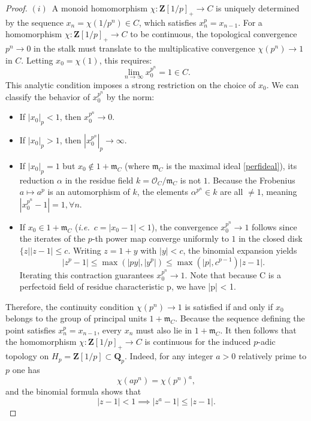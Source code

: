 \documentclass[11pt,a4paper]{article}
\newcommand{\Q}{\mathbf{Q}}
\newcommand{\Z}{\mathbf{Z}}
\def\ie{{\it i.e.\/}\ }
\begin{document}
\begin{proof} 
$(i)$~A  monoid homomorphism $\chi : \Z[1/p]_+ \to C$ is uniquely determined by the sequence $x_n = \chi(1/p^n) \in C$, which satisfies $x_n^p = x_{n-1}$. For a homomorphism $\chi : \Z[1/p]_+ \to C$ to be continuous, the topological convergence $p^n \to 0$ in the stalk must translate to the multiplicative convergence $\chi(p^n) \to 1$ in $C$. Letting $x_0 = \chi(1)$, this requires:
\[
\lim_{n \to \infty} x_0^{p^n} = 1 \in C.
\]
This analytic condition imposes a strong restriction on the choice of $x_0$. We can classify the behavior of $x_0^{p^n}$ by the  norm:
\begin{itemize}
    \item If $|x_0|_p < 1$, then $x_0^{p^n} \to 0$.
    \item If $|x_0|_p > 1$, then $|x_0^{p^n}|_p \to \infty$.
    \item If $|x_0|_p = 1$ but $x_0 \notin 1 + \mathfrak{m}_{C}$ (where $\mathfrak{m}_{C}$ is the maximal ideal \eqref{perfideal}), its reduction $\alpha$ in the residue field $
k=\mathcal{O}_C / \mathfrak{m}_C
$ is not $1$. Because the Frobenius $a \mapsto a^p$ is an automorphism of $k$, the elements $\alpha^{p^n}\in k$ are all  $\neq 1$, meaning $|x_0^{p^n} - 1|= 1, \forall n$.
    \item If $x_0 \in 1 + \mathfrak{m}_{C}$ (\ie $c=|x_0 - 1| < 1$), the convergence $x_0^{p^n}\to 1$ follows since the iterates of the $p$-th power map converge uniformly to $1$ in the closed disk $\{z\mid \vert z-1\vert\leq c$. Writing $z = 1+y$ with $|y| < c$, the binomial expansion yields $$|z^p - 1| \le \max(|py|, |y^p|)\leq \max(\vert p\vert ,c^{p-1} )\vert z-1\vert. $$ 
    Iterating this contraction guarantees $x_0^{p^n} \to 1$. Note that because C is a perfectoid field of residue characteristic p, we have |p| < 1. 
\end{itemize}
Therefore, the continuity condition $\chi(p^n) \to 1$ is satisfied if and only if $x_0$ belongs to the group of principal units $1 + \mathfrak{m}_{C}$. Because the sequence defining the point satisfies $x_n^p = x_{n-1}$, every $x_n$ must also lie in $1 + \mathfrak{m}_{C}$. It then follows that the homomorphism $\chi : \Z[1/p]_+ \to C$ is continuous for the induced $p$-adic topology on $H_p=\Z[1/p]\subset \Q_p$. Indeed, for any integer $a>0$ relatively prime to $p$ one has 
$$
\chi(ap^n)=\chi(p^n)^a,
$$
and the binomial formula shows that 
$$
\vert z-1\vert <1\implies \vert z^a-1\vert \leq \vert z-1\vert.
$$







\end{proof}
\end{document}
